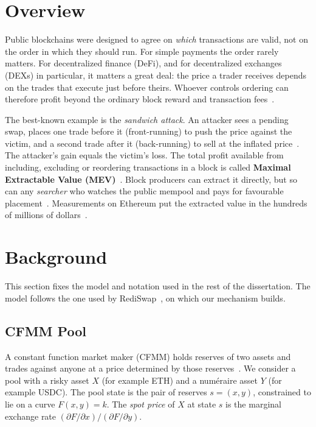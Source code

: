 \section{Overview}

Public blockchains were designed to agree on \emph{which} transactions are valid, not on the order in which they should run. For simple payments the order rarely matters. For decentralized finance (DeFi), and for decentralized exchanges (DEXs) in particular, it matters a great deal: the price a trader receives depends on the trades that execute just before theirs. Whoever controls ordering can therefore profit beyond the ordinary block reward and transaction fees~\cite{daian2020flash}.

The best-known example is the \emph{sandwich attack}. An attacker sees a pending swap, places one trade before it (front-running) to push the price against the victim, and a second trade after it (back-running) to sell at the inflated price~\cite{zhou2021high}. The attacker's gain equals the victim's loss. The total profit available from including, excluding or reordering transactions in a block is called \textbf{Maximal Extractable Value (MEV)}~\cite{daian2020flash,yang2022sok}. Block producers can extract it directly, but so can any \emph{searcher} who watches the public mempool and pays for favourable placement~\cite{flashbots2022}. Measurements on Ethereum put the extracted value in the hundreds of millions of dollars~\cite{qin2022quantifying}.

\section{Background}

This section fixes the model and notation used in the rest of the dissertation. The model follows the one used by RediSwap~\cite{zhang2024rediswap}, on which our mechanism builds.

\subsection{CFMM Pool}

A constant function market maker (CFMM) holds reserves of two assets and trades against anyone at a price determined by those reserves~\cite{angeris2020improved}. We consider a pool with a risky asset $X$ (for example ETH) and a num\'eraire asset $Y$ (for example USDC). The pool state is the pair of reserves $s=(x,y)$, constrained to lie on a curve $F(x,y)=k$. The \emph{spot price} of $X$ at state $s$ is the marginal exchange rate $(\partial F/\partial x)/(\partial F/\partial y)$.

